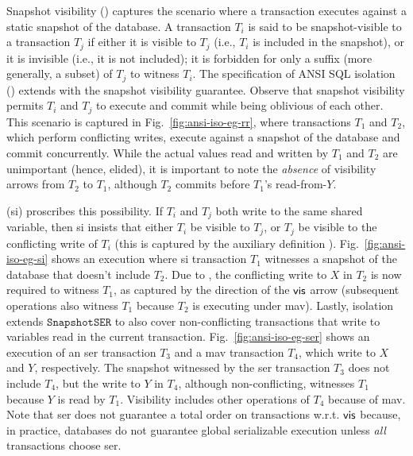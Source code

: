 Snapshot visibility () captures the scenario where a
transaction executes against a static snapshot of the database.  A
transaction $T_i$ is said to be snapshot-visible to a transaction
$T_j$ if either it is visible to $T_j$ (i.e., $T_i$ is included in the
snapshot), or it is invisible (i.e., it is not included); it is
forbidden for only a suffix (more generally, a subset) of $T_j$ to
witness $T_i$. The specification of ANSI SQL 
isolation () extends  with the snapshot visibility
guarantee.  Observe that snapshot visibility permits $T_i$ and $T_j$
to execute and commit while being oblivious of each other. This
scenario is captured in Fig.~\ref{fig:ansi-iso-eg-rr}, where
transactions $T_1$ and $T_2$, which perform conflicting writes,
execute against a snapshot of the database and commit concurrently.
While the actual values read and written by $T_1$ and $T_2$ are
unimportant (hence, elided), it is important to note the
\emph{absence} of visibility arrows from $T_2$ to $T_1$, although $T_2$
commits before $T_1$'s read-from-$Y$.

 ({\sc si}) proscribes this possibility. If
$T_i$ and $T_j$ both write to the same shared variable, then {\sc si}
insists that either $T_i$ be visible to $T_j$, or $T_j$ be visible to
the conflicting write of $T_i$ (this is captured by the auxiliary
definition ). Fig.~\ref{fig:ansi-iso-eg-si} shows an
execution where {\sc si} transaction $T_1$ witnesses a snapshot of the
database that doesn't include $T_2$. Due to , the
conflicting write to $X$ in $T_2$ is now required to witness $T_1$, as
captured by the direction of the $\textsf{vis}$ arrow (subsequent operations
also witness $T_1$ because $T_2$ is executing under {\sc mav}).
Lastly,  isolation extends $\mathtt{SnapshotSER}$ to
also cover non-conflicting transactions that write to variables read
in the current transaction.  Fig.~\ref{fig:ansi-iso-eg-ser} shows an
execution of an {\sc ser} transaction $T_3$ and a {\sc mav}
transaction $T_4$, which write to $X$ and $Y$, respectively. The
snapshot witnessed by the {\sc ser} transaction $T_3$ does not include
$T_4$, but the write to $Y$ in $T_4$, although non-conflicting,
witnesses $T_1$ because $Y$ is read by $T_1$. Visibility includes
other operations of $T_4$ because of {\sc mav}. Note that {\sc ser}
does not guarantee a total order on transactions w.r.t. $\textsf{vis}$
because, in practice, databases do not guarantee global serializable
execution unless \emph{all} transactions choose {\sc ser}.

